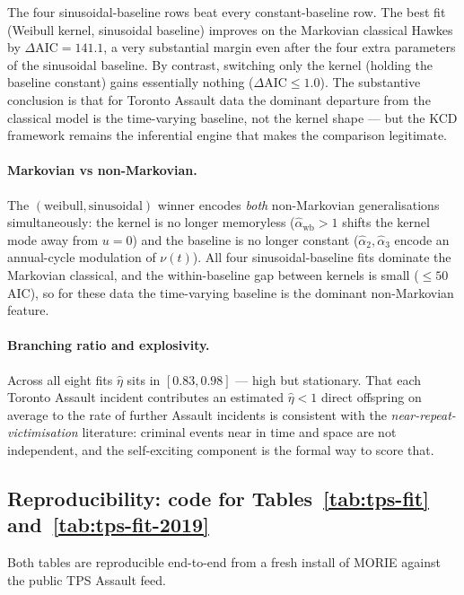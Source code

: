 \documentclass[article,shortnames,nojss]{jss}
\newcommand{\1}{\mathbbm{1}}
\theoremstyle{plain}
\theoremstyle{definition}
\begin{document}
The four sinusoidal-baseline rows beat every constant-baseline row.
The best fit (Weibull kernel, sinusoidal baseline) improves on the
Markovian classical Hawkes by $\Delta\mathrm{AIC} = 141.1$, a very
substantial margin even after the four extra parameters of the
sinusoidal baseline.  By contrast, switching only the kernel
(holding the baseline constant) gains essentially nothing
($\Delta\mathrm{AIC} \le 1.0$).  The substantive conclusion is
that for Toronto Assault data the dominant departure from the
classical model is the time-varying baseline, not the kernel
shape --- but the KCD framework remains the inferential engine that
makes the comparison legitimate.

\paragraph{Markovian vs non-Markovian.}  The
$(\text{weibull},\text{sinusoidal})$ winner encodes \emph{both}
non-Markovian generalisations simultaneously: the kernel is no
longer memoryless ($\hat\alpha_{\text{wb}}>1$ shifts the kernel
mode away from $u=0$) and the baseline is no longer constant
($\hat\alpha_2,\hat\alpha_3$ encode an annual-cycle modulation of
$\nu(t)$).  All four sinusoidal-baseline fits dominate the
Markovian classical, and the within-baseline gap between kernels
is small ($\le 50$ AIC), so for these data the time-varying
baseline is the dominant non-Markovian feature.

\paragraph{Branching ratio and explosivity.}  Across all eight
fits $\hat\eta$ sits in $[0.83, 0.98]$ --- high but stationary.
That each Toronto Assault incident contributes an estimated
$\hat\eta < 1$ direct offspring on average to the rate of further
Assault incidents is consistent with the
\emph{near-repeat-victimisation} literature: criminal events
near in time and space are not independent, and the self-exciting
component is the formal way to score that.

\subsection[Reproducibility code]{Reproducibility: code for Tables~\ref{tab:tps-fit} and~\ref{tab:tps-fit-2019}}
\label{sec:application-reproducibility}

Both tables are reproducible end-to-end from a fresh install of MORIE
\citep{Ruhela2026MoriePy} against the public TPS Assault feed.
\end{document}
